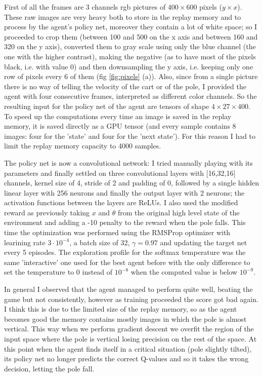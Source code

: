 \documentclass[a4paper, 11pt]{article}
\begin{document}
  First of all the frames are 3 channels rgb pictures of $400 \times 600$ pixels ($y\times x$). These raw images are very heavy both to store in the replay memory and to process by the agent's policy net, moreover they contain a lot of white space; so I proceeded to crop them (between 100 and 500 on the x axis and between 160 and 320 on the y axis), converted them to gray scale using only the blue channel (the one with the higher contrast), making the negative (as to have most of the pixels black, i.e. with value 0) and then downsampling the y axis, i.e. keeping only one row of pixels every 6 of them (fig \ref{fig:pixels} (a)).
  Also, since from a single picture there is no way of telling the velocity of the cart or of the pole, I provided the agent with four consecutive frames, interpreted as different color channels. So the resulting input for the policy net of the agent are tensors of shape $4 \times 27 \times 400$. To speed up the computations every time an image is saved in the replay memory, it is saved directly as a GPU tensor (and every sample contains 8 images: four for the 'state' and four for the 'next state'). For this reason I had to limit the replay memory capacity to 4000 samples.

  The policy net is now a convolutional network: I tried manually playing with its parameters and finally settled on three convolutional layers with [16,32,16] channels, kernel size of 4, stride of 2 and padding of 0, followed by a single hidden linear layer with 256 neurons and finally the output layer with 2 neurons; the activation functions between the layers are ReLUs. I also used the modified reward as previously taking $x$ and $\theta$ from the original high level state of the environment and adding a -10 penalty to the reward when the pole falls. This time the optimization was performed using the RMSProp optimizer with learining rate $3\cdot10^{-4}$, a batch size of 32, $\gamma=0.97$ and updating the target net every 5 episodes. The exploration profile for the softmax temperature was the same 'interactive' one used for the best agent before with the only difference to set the temperature to 0 instead of $10^{-8}$ when the computed value is below $10^{-9}$.

  In general I observed that the agent managed to perform quite well, beating the game but not consistently, however as training proceeded the score got bad again. I think this is due to the limited size of the replay memory, so as the agent becomes good the memory contains mostly images in which the pole is almost vertical. This way when we perform gradient descent we overfit the region of the input space where the pole is vertical losing precision on the rest of the space. At this point when the agent finds itself in a critical situation (pole slightly tilted), its policy net no longer predicts the correct Q-values and so it takes the wrong decision, letting the pole fall.
\end{document}
